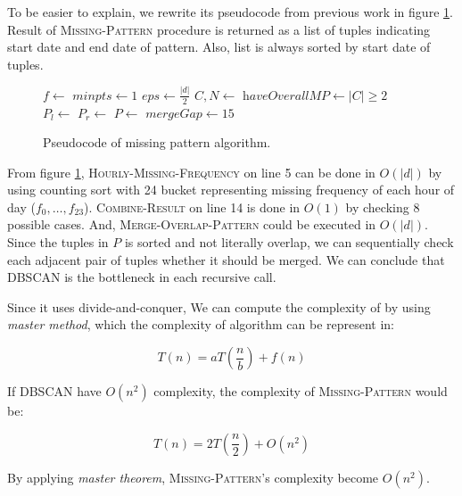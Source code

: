 \documentclass[conference]{IEEEtran}
\begin{document}
To be easier to explain, we rewrite its pseudocode from previous work in figure \ref{fig:missingpattern_pseudocode}. Result of \textsc{Missing-Pattern} procedure is returned as a list of tuples indicating start date and end date of pattern. Also, list is always sorted by start date of tuples.

\begin{figure}[H]
\begin{algorithmic}[1]
\State\Return{$\emptyset$}
\EndIf
\State $f \gets$ 
\State $minpts \gets 1$
\State $eps \gets \frac{|d|}{2}$
\State $C, N \gets$ 
\State
\State $\textit{haveOverallMP} \gets |C| \ge 2$
\State
\State $P_{l} \gets$ 
\State $P_{r} \gets$ 
\State $P \gets$ 
\State
\State $\textit{mergeGap} \gets 15$ 
\State {}
\EndProcedure
\end{algorithmic}
\caption{Pseudocode of missing pattern algorithm.}
\label{fig:missingpattern_pseudocode}
\end{figure}

From figure \ref{fig:missingpattern_pseudocode}, \textsc{Hourly-Missing-Frequency} on line 5 can be done in $O(|d|)$ by using counting sort with 24 bucket representing missing frequency of each hour of day ($f_{0},\ldots,f_{23}$). \textsc{Combine-Result} on line 14 is done in $O(1)$ by checking 8 possible cases. And, \textsc{Merge-Overlap-Pattern} could be executed in $O(|d|)$. Since the tuples in $P$ is sorted and not literally overlap, we can sequentially check each adjacent pair of tuples whether it should be merged. We can conclude that \textsc{DBSCAN} is the bottleneck in each recursive call.

Since it uses divide-and-conquer, We can compute the complexity of by using \textit{master method}, which the complexity of algorithm can be represent in:

\[
T(n) = aT(\frac{n}{b}) + f(n)
\]

If \textsc{DBSCAN} have $O(n^2)$ complexity, the complexity of \textsc{Missing-Pattern} would be:

\[
T(n) = 2T(\frac{n}{2}) + O(n^2)
\]

By applying \textit{master theorem}, \textsc{Missing-Pattern}'s complexity become $O(n^2)$.
\end{document}
